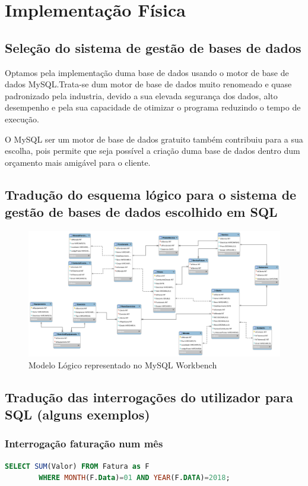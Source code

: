 \chapter{Implementação Física}
\section{Seleção do sistema de gestão de bases de dados}
Optamos pela implementação duma base de dados usando o motor de base de dados MySQL.Trata-se dum motor de base de dados muito renomeado e quase padronizado pela industria, devido a sua elevada segurança dos dados, alto desempenho e pela sua capacidade de otimizar o programa reduzindo o tempo de execução. \par 
O MySQL ser um  motor de base de dados gratuito também contribuiu para a sua escolha, pois permite que seja possível a criação duma base de dados dentro dum orçamento mais amigável para o cliente.


\section{Tradução do esquema lógico para o sistema de gestão de bases de dados escolhido em SQL}

\begin{figure}[h]
\centering
\includegraphics[width=\textwidth]{implementacao_fisica/ModeloLogico.png}
\caption{Modelo Lógico representado no MySQL Workbench}
\label{fig:mod_logico_mysql}
\end{figure}

\clearpage

\section{Tradução das interrogações do utilizador para SQL (alguns exemplos)}

\subsection{Interrogação faturação num mês}
\begin{lstlisting}[language=SQL]
    SELECT SUM(Valor) FROM Fatura as F
	    WHERE MONTH(F.Data)=01 AND YEAR(F.DATA)=2018; 
\end{lstlisting}

